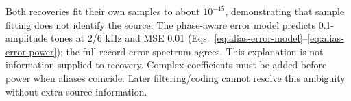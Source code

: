 \noindent\begin{minipage}{\linewidth}
Both recoveries fit their own samples to about $10^{-15}$, demonstrating
that sample fitting does not identify the source. The phase-aware error
model predicts 0.1-amplitude tones at 2/6 kHz and MSE 0.01
(Eqs.~\eqref{eq:alias-error-model}--\eqref{eq:alias-error-power}); the
full-record error spectrum agrees. This explanation is not information
supplied to recovery. Complex coefficients must be added before power
when aliases coincide. Later filtering/coding cannot resolve this
ambiguity without extra source information.
\end{minipage}\par

